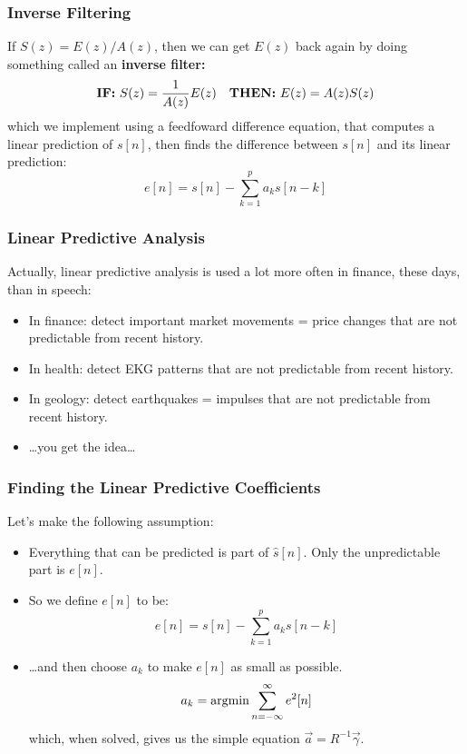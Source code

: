 \documentclass{beamer}
\newcommand{\argmin}{\operatornamewithlimits{argmin}}
\begin{document}
\begin{frame}
  \frametitle{Inverse Filtering}

  If $S(z) = E(z)/A(z)$, then we can get $E(z)$ back again by doing
  something called an {\bf inverse filter:}
  \begin{displaymath}
    \mbox{\bf IF:}~S(z) = \frac{1}{A(z)}E(z)~~~
    \mbox{\bf THEN:}~E(z) = A(z)S(z)
  \end{displaymath}
  which we implement using a feedfoward difference equation, that
  computes a linear prediction of $s[n]$, then finds the difference
  between $s[n]$ and its linear prediction:
  \begin{displaymath}
    e[n] = s[n] - \sum_{k=1}^p a_k s[n-k]
  \end{displaymath}
\end{frame}

\begin{frame}
  \frametitle{Linear Predictive Analysis}

  Actually, linear predictive analysis is used a lot more often in
  finance, these days, than in speech:
  \begin{itemize}
  \item In finance: detect important market movements = price changes
    that are not predictable from recent history.
  \item In health: detect EKG patterns that are not predictable from
    recent history.
  \item In geology: detect earthquakes = impulses that are not
    predictable from recent history.
  \item \ldots you get the idea\ldots
  \end{itemize}
\end{frame}
    
\begin{frame}
  \frametitle{Finding the Linear Predictive Coefficients}

  Let's make the following assumption:
  \begin{itemize}
  \item Everything that can be predicted is part of $\hat{s}[n]$.
    Only the unpredictable part is $e[n]$.
  \item So we define $e[n]$ to be:
    \begin{displaymath}
      e[n] = s[n] -\sum_{k=1}^p a_k s[n-k]
    \end{displaymath}
  \item \ldots and then choose $a_k$ to make $e[n]$ as small as possible.
    \begin{displaymath}
      a_k = \argmin \sum_{n=-\infty}^\infty e^2[n]
    \end{displaymath}
    which, when solved, gives us the simple equation $\vec{a}=R^{-1}\vec\gamma$.
  \end{itemize}
\end{frame}
  
  
\end{document}
